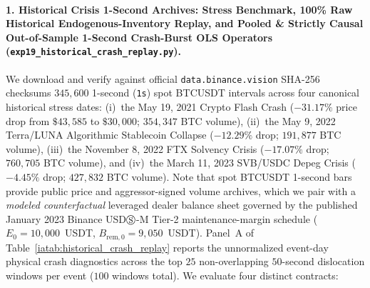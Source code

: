 \documentclass[12pt]{article}
\theoremstyle{definition}
\theoremstyle{remark}
\begin{document}
\paragraph{1. Historical Crisis 1-Second Archives: Stress Benchmark, 100\% Raw Historical Endogenous-Inventory Replay, and Pooled \& Strictly Causal Out-of-Sample 1-Second Crash-Burst OLS Operators (\nolinkurl{exp19_historical_crash_replay.py}).}
We download and verify against official \texttt{data.binance.vision} SHA-256 checksums $345{,}600$ 1-second (\texttt{1s}) spot BTCUSDT intervals across four canonical historical stress dates: (i)~the May 19, 2021 Crypto Flash Crash ($-31.17\%$ price drop from $\$43{,}585$ to $\$30{,}000$; $354{,}347$ BTC volume), (ii)~the May 9, 2022 Terra/LUNA Algorithmic Stablecoin Collapse ($-12.29\%$ drop; $191{,}877$ BTC volume), (iii)~the November 8, 2022 FTX Solvency Crisis ($-17.07\%$ drop; $760{,}705$ BTC volume), and (iv)~the March 11, 2023 SVB/USDC Depeg Crisis ($-4.45\%$ drop; $427{,}832$ BTC volume). Note that spot BTCUSDT 1-second bars provide public price and aggressor-signed volume archives, which we pair with a \emph{modeled counterfactual} leveraged dealer balance sheet governed by the published January 2023 Binance USD$\circledS$-M Tier-2 maintenance-margin schedule ($E_0 = 10{,}000$~USDT, $B_{\mathrm{rem},0} = 9{,}050$~USDT). Panel~A of Table~\ref{iatab:historical_crash_replay} reports the unnormalized event-day physical crash diagnostics across the top $25$ non-overlapping $50$-second dislocation windows per event ($100$ windows total). We evaluate four distinct contracts:
\end{document}

